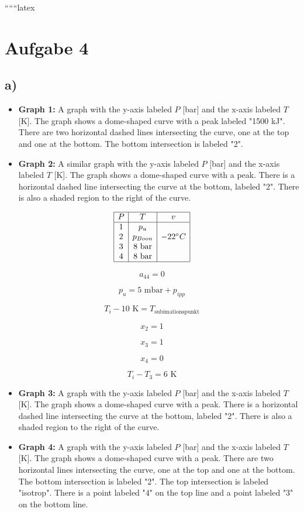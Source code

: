 
``````latex


\section*{Aufgabe 4}

\subsection*{a)}

\begin{itemize}
    \item \textbf{Graph 1:} A graph with the y-axis labeled \( P \) [bar] and the x-axis labeled \( T \) [K]. The graph shows a dome-shaped curve with a peak labeled "1500 kJ". There are two horizontal dashed lines intersecting the curve, one at the top and one at the bottom. The bottom intersection is labeled "2".
    \item \textbf{Graph 2:} A similar graph with the y-axis labeled \( P \) [bar] and the x-axis labeled \( T \) [K]. The graph shows a dome-shaped curve with a peak. There is a horizontal dashed line intersecting the curve at the bottom, labeled "2". There is also a shaded region to the right of the curve.
\end{itemize}

\[
\begin{array}{|c|c|c|}
\hline
P & T & v \\
\hline
1 & p_u & \\
2 & p_{Boon} & -22^\circ C \\
3 & 8 \text{ bar} & \\
4 & 8 \text{ bar} & \\
\hline
\end{array}
\]

\[
a_{44} = 0
\]

\[
p_u = 5 \text{ mbar} + p_{ipp}
\]

\[
T_i - 10 \text{ K} = T_{\text{subimationspunkt}}
\]

\[
x_2 = 1
\]

\[
x_3 = 1
\]

\[
x_4 = 0
\]

\[
T_i - T_3 = 6 \text{ K}
\]

\begin{itemize}
    \item \textbf{Graph 3:} A graph with the y-axis labeled \( P \) [bar] and the x-axis labeled \( T \) [K]. The graph shows a dome-shaped curve with a peak. There is a horizontal dashed line intersecting the curve at the bottom, labeled "2". There is also a shaded region to the right of the curve.
    \item \textbf{Graph 4:} A graph with the y-axis labeled \( P \) [bar] and the x-axis labeled \( T \) [K]. The graph shows a dome-shaped curve with a peak. There are two horizontal lines intersecting the curve, one at the top and one at the bottom. The bottom intersection is labeled "2". The top intersection is labeled "isotrop". There is a point labeled "4" on the top line and a point labeled "3" on the bottom line.
\end{itemize}

